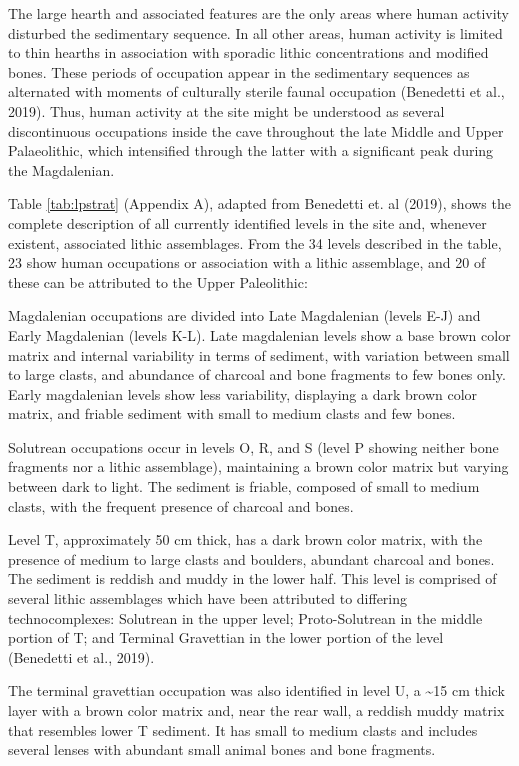 \documentclass[12pt,twoside]{reedthesis}
\begin{document}
The large hearth and associated features are the only areas where human activity disturbed the sedimentary sequence. In all other areas, human activity is limited to thin hearths in association with sporadic lithic concentrations and modified bones. These periods of occupation appear in the sedimentary sequences as alternated with moments of culturally sterile faunal occupation (Benedetti et al., 2019). Thus, human activity at the site might be understood as several discontinuous occupations inside the cave throughout the late Middle and Upper Palaeolithic, which intensified through the latter with a significant peak during the Magdalenian.

Table \ref{tab:lpstrat} (Appendix A), adapted from Benedetti et. al (2019), shows the complete description of all currently identified levels in the site and, whenever existent, associated lithic assemblages. From the 34 levels described in the table, 23 show human occupations or association with a lithic assemblage, and 20 of these can be attributed to the Upper Paleolithic:

Magdalenian occupations are divided into Late Magdalenian (levels E-J) and Early Magdalenian (levels K-L). Late magdalenian levels show a base brown color matrix and internal variability in terms of sediment, with variation between small to large clasts, and abundance of charcoal and bone fragments to few bones only. Early magdalenian levels show less variability, displaying a dark brown color matrix, and friable sediment with small to medium clasts and few bones.

Solutrean occupations occur in levels O, R, and S (level P showing neither bone fragments nor a lithic assemblage), maintaining a brown color matrix but varying between dark to light. The sediment is friable, composed of small to medium clasts, with the frequent presence of charcoal and bones.

Level T, approximately 50 cm thick, has a dark brown color matrix, with the presence of medium to large clasts and boulders, abundant charcoal and bones. The sediment is reddish and muddy in the lower half. This level is comprised of several lithic assemblages which have been attributed to differing technocomplexes: Solutrean in the upper level; Proto-Solutrean in the middle portion of T; and Terminal Gravettian in the lower portion of the level (Benedetti et al., 2019).

The terminal gravettian occupation was also identified in level U, a \textasciitilde15 cm thick layer with a brown color matrix and, near the rear wall, a reddish muddy matrix that resembles lower T sediment. It has small to medium clasts and includes several lenses with abundant small animal bones and bone fragments.
\end{document}
